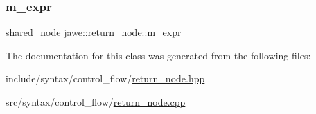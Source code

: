 \subsubsection{\texorpdfstring{m\+\_\+expr}{m\_expr}}
{\footnotesize\ttfamily \hyperlink{namespacejawe_a3f307481d921b6cbb50cc8511fc2b544}{shared\+\_\+node} jawe\+::return\+\_\+node\+::m\+\_\+expr\hspace{0.3cm}{\ttfamily [private]}}



The documentation for this class was generated from the following files\+:\begin{DoxyCompactItemize}
\item 
include/syntax/control\+\_\+flow/\hyperlink{return__node_8hpp}{return\+\_\+node.\+hpp}\item 
src/syntax/control\+\_\+flow/\hyperlink{return__node_8cpp}{return\+\_\+node.\+cpp}\end{DoxyCompactItemize}
